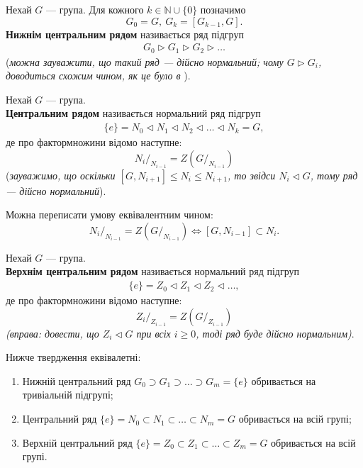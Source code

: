 \documentclass{math_library}
\begin{document}
\begin{definition}
Нехай $G$ --- група. Для кожного $k \in \mathbb{N} \cup \{0\}$ позначимо 
\[
G_0 = G,\ G_k = [G_{k-1},G].
\]
\textbf{Нижнім центральним рядом} називається ряд підгруп
\begin{align*}
G_0 \triangleright G_1 \triangleright G_2 \triangleright \dots
\end{align*}
(\textit{можна зауважити, що такий ряд --- дійсно нормальний; чому $G \triangleright G_i$, доводиться схожим чином, як це було в }).
\end{definition}

\begin{definition}
Нехай $G$ --- група.\\
\textbf{Центральним рядом} називається нормальний ряд підгруп
\begin{align*}
\{e\} = N_0 \triangleleft N_1 \triangleleft N_2 \triangleleft \dots \triangleleft N_k = G,
\end{align*}
де про фактормножини відомо наступне: 
\[
{N_i}/_{N_{i-1}} = Z\left(G/_{N_{i-1}}\right)
\]
(\textit{зауважимо, що оскільки $[G,N_{i+1}] \leq N_{i} \leq N_{i+1}$, то звідси $N_i \triangleleft G$, тому ряд --- дійсно нормальний}).
\end{definition}

\begin{remark}
Можна переписати умову еквівалентним чином:
\[
{N_i}/_{N_{i-1}} = Z\left(G/_{N_{i-1}}\right) \iff [G, N_{i-1}] \subset N_i.
\]
\end{remark}

\begin{definition}
Нехай $G$ --- група.\\
\textbf{Верхнім центральним рядом} називається нормальний ряд підгруп
\begin{align*}
\{e\} = Z_0 \triangleleft Z_1 \triangleleft Z_2 \triangleleft \dots,
\end{align*}
де про фактормножини відомо наступне:
\[
{Z_i}/_{Z_{i-1}} = Z(G/_{Z_{i-1}})
\]
\textit{(вправа: довести, що $Z_i \triangleleft G$ при всіх $i \geq 0$, тоді ряд буде дійсно нормальним)}.
\end{definition}

\begin{proposition}
Нижче твердження еквівалетні:
\begin{enumerate}[nosep,wide=0pt,label={\arabic*)}]
\item Нижній центральний ряд $G_0 \supset G_1 \supset \dots \supset G_m = \{e\}$ обривається на тривіальній підгрупі;
\item Центральний ряд $\{e\} = N_0 \subset N_1 \subset \dots \subset N_m = G$ обривається на всій групі;
\item Верхній центральний ряд $\{e\} = Z_0 \subset Z_1 \subset \dots \subset Z_m = G$ обривається на всій групі.
\end{enumerate}
\end{proposition}
\end{document}
